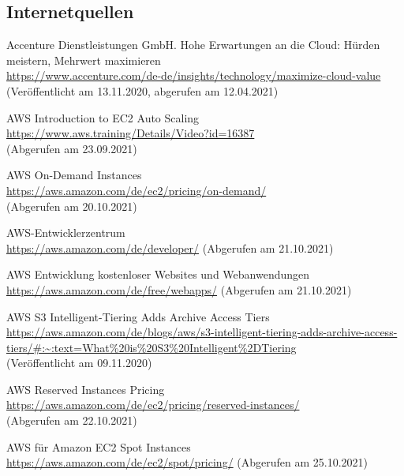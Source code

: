 \subsection{Internetquellen}
\begin{thebibliography}{HR08} %
  Accenture Dienstleistungen GmbH. Hohe Erwartungen an die Cloud: Hürden meistern, Mehrwert maximieren \\
  \url{https://www.accenture.com/de-de/insights/technology/maximize-cloud-value}\\
  (Veröffentlicht am 13.11.2020, abgerufen am 12.04.2021)
  
  AWS Introduction to EC2 Auto Scaling\\
  \url{https://www.aws.training/Details/Video?id=16387}\\
  (Abgerufen am 23.09.2021)

  AWS On-Demand Instances \\
  \url{https://aws.amazon.com/de/ec2/pricing/on-demand/}\\
  (Abgerufen am 20.10.2021)

  AWS-Entwicklerzentrum \\
  \url{https://aws.amazon.com/de/developer/}
  (Abgerufen am 21.10.2021)

  AWS Entwicklung kostenloser Websites
  und Webanwendungen   \\
  \url{https://aws.amazon.com/de/free/webapps/}
  (Abgerufen am 21.10.2021)


   AWS S3 Intelligent-Tiering Adds Archive Access Tiers \\
  \url{https://aws.amazon.com/de/blogs/aws/s3-intelligent-tiering-adds-archive-access-tiers/#:~:text=What%20is%20S3%20Intelligent%2DTiering}\\
  (Veröffentlicht am 09.11.2020)

  AWS Reserved Instances Pricing\\
  \url{https://aws.amazon.com/de/ec2/pricing/reserved-instances/}\\
  (Abgerufen am 22.10.2021)

   AWS für Amazon EC2 Spot Instances\\
  \url{https://aws.amazon.com/de/ec2/spot/pricing/}
  (Abgerufen am 25.10.2021)


\end{thebibliography}
